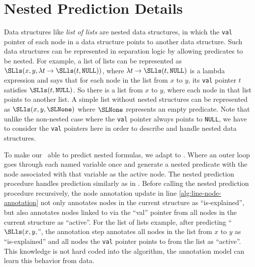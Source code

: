 \section{Nested Prediction Details}
\label{appendix:nested-prediction}

Data structures like \emph{list of lists} are nested data structures, in which
the \texttt{val} pointer of each node in a data structure points to another data
structure.  Such data structures can
be represented in separation logic by allowing predicates to be nested.  For
example, a list of lists can be represented as $\SLls(x, y, \lambda
t\rightarrow\SLls(t, \texttt{NULL}))$, where $\lambda t\rightarrow\SLls(t,
\texttt{NULL})$ is a lambda expression and says that for each node in the
list from $x$ to $y$, its \texttt{val} pointer $t$ satisfies $\SLls(t,
\texttt{NULL})$. So there is
a list from $x$ to $y$, where each node in that list points to another list. A
simple list without nested structures can be represented as $\SLls(x, y,
\SLNone)$ where $\SLNone$ represents an empty predicate. Note
that unlike the non-nested case where the \texttt{val} pointer always points
to \texttt{NULL}, we have to
consider the \texttt{val} pointers here in order to describe and handle nested data
structures.

To make our \OurMethodShorts~able to predict nested formulas, we adapt
 to . Where
an outer loop goes through each named variable once and generate a nested predicate
with the node associated with that variable as the active node. The nested
prediction procedure handles prediction similarly as in
. Before calling the nested prediction
procedure recursively, the node annotation update in line
\ref{alg:line-node-annotation} not only annotates nodes in the current structure
as ``is-explained'', but also annotates nodes linked to via the ``val'' pointer
from all nodes in the current structure as ``active''. For the list of lists
example, after predicting ``$\SLls(x, y,$'', the annotation step annotates all
nodes in the list from $x$ to $y$ as ``is-explained'' and all nodes the
\texttt{val} pointer points to from the list as ``active''.  This knowledge is
not hard coded into the algorithm, the annotation model can learn this
behavior from data.

